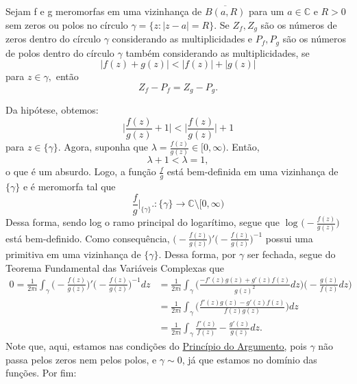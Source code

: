 \documentclass[ComplexAnalysis/complex.tex]{subfiles}
\begin{document}
\hypertarget{rouche}{\begin{theorem*}
		Sejam f e g meromorfas em uma vizinhança de \(\overline{B(a, R)}\) para um \(a\in \mathbb{C}\) e \(R > 0\) sem zeros ou polos no círculo \(\gamma = \{z: |z-a| = R\}.\)
		Se \(Z_{f}, Z_{g}\) são os números de zeros dentro do círculo \(\gamma \) considerando as multiplicidades e \(P_{f}, P_{g}\) são os números de polos dentro do círculo \(\gamma \) também
		considerando as multiplicidades, se
		\[
			|f(z) + g(z)| < |f(z)| + |g(z)|
		\]
		para \(z\in \gamma ,\) então
		\[
			Z_{f} - P_{f} = Z_{g} - P_{g}.
		\]
	\end{theorem*}}
\begin{proof*}
	Da hipótese, obtemos:
	\[
		\biggl\vert \frac{f(z)}{g(z)} + 1 \biggr\vert < \biggl\vert \frac{f(z)}{g(z)} \biggr\vert + 1
	\]
	para \(z\in \{\gamma \}\). Agora, suponha que \(\lambda = \frac{f(z)}{g(z)}\in [0, \infty).\) Então,
	\[
		\lambda + 1 < \lambda  = 1,
	\]
	o que é um absurdo. Logo, a função \(\frac{f}{g}\) está bem-definida em uma vizinhança de \(\{\gamma \}\) e é meromorfa tal que
	\[
		\frac{f}{g}\biggl|_{\{\gamma \}}\biggr.:\{\gamma \}\rightarrow \mathbb{C}\setminus{[0, \infty)}
	\]
	Dessa forma, sendo log o ramo principal do logarítimo, segue que \(\log^{}{\biggl(-\frac{f(z)}{g(z)}\biggr)}\) está bem-definido. Como consequência,
	\(\biggl(-\frac{f(z)}{g(z)}\biggr)'\biggl(-\frac{f(z)}{g(z)}\biggr)^{-1}\) possui uma primitiva em uma vizinhança de \(\{\gamma \}.\) Dessa forma, por \(\gamma \)
	ser fechada, segue do Teorema Fundamental das Variáveis Complexas que
	\begin{align*}
		0 = \frac{1}{2\pi i}\int_{\gamma }^{}\biggl(-\frac{f(z)}{g(z)}\biggr)'\biggl(-\frac{f(z)}{g(z)}\biggr)^{-1}dz & = \frac{1}{2\pi i}\int_{\gamma }^{}\biggl(\frac{-f'(z)g(z) + g'(z)f(z)}{g(z)^{2}}dz\biggr)\biggl(-\frac{g(z)}{f(z)}dz\biggr) \\
		                                                                                                              & = \frac{1}{2\pi i}\int_{\gamma }^{}\biggl(\frac{f'(z)g(z) - g'(z)f(z)}{f(z)g(z)}\biggr)dz                                    \\
		                                                                                                              & = \frac{1}{2\pi i}\int_{\gamma }^{}\frac{f'(z)}{f(z)} - \frac{g'(z)}{g(z)}dz.
	\end{align*}
	Note que, aqui, estamos nas condições do \hyperlink{argument-principle}{Princípio do Argumento,} pois \(\gamma \) não passa pelos zeros nem pelos polos, e \(\gamma \sim 0\), já que estamos no domínio das funções. Por fim:

\end{proof*}
\end{document}
